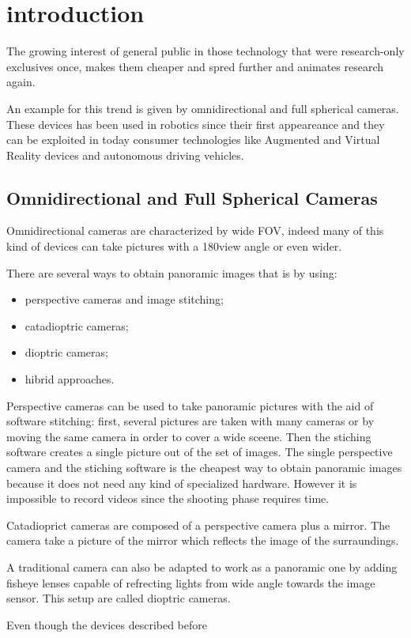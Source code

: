 \chapter{introduction}
The growing interest of general public in those technology that were 
research-only exclusives once, makes them cheaper and spred further and
animates research again.

An example for this trend is given by omnidirectional and full spherical 
cameras.
These devices has been used in robotics since their first appeareance and they 
can be exploited in today consumer technologies like Augmented and Virtual 
Reality devices and autonomous driving vehicles.

\section{Omnidirectional and Full Spherical Cameras}
Omnidirectional cameras are characterized by wide FOV, indeed many of this kind
of devices can take pictures with a 180\degree view angle or even wider.

There are several ways to obtain panoramic images that is by using:
\begin{itemize}
	\item perspective cameras and image stitching;
	\item catadioptric cameras;
	\item dioptric cameras;
	\item hibrid approaches.
\end{itemize}

Perspective cameras can be used to take panoramic pictures with the aid of 
software stitching: first, several pictures are taken with many cameras or by moving 
the same camera in order to cover a wide sceene. Then the stiching software 
creates a single picture out of the set of images.
The single perspective camera and the stiching software is the cheapest 
way to obtain panoramic images because it does not need any kind of specialized 
hardware. However it is impossible to record videos since the shooting phase 
requires time.

Catadioprict cameras are composed of a perspective camera plus a mirror. 
The camera take a picture of the mirror which reflects the image of the 
surraundings.

A traditional camera can also be adapted to work as a panoramic one by adding
fisheye lenses capable of refrecting lights from wide angle towards the 
image sensor. This setup are called dioptric cameras.

Even though the devices described before 
